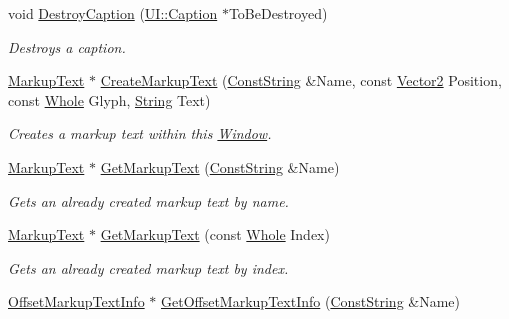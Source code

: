 \begin{DoxyCompactItemize}
void \hyperlink{classphys_1_1UI_1_1Window_a4e3dbe56ca1efce7ac1d26ceb8f7e915}{DestroyCaption} (\hyperlink{classphys_1_1UI_1_1Caption}{UI::Caption} $\ast$ToBeDestroyed)
\begin{DoxyCompactList}\small\item\em Destroys a caption. \item\end{DoxyCompactList}\item 
\hyperlink{classphys_1_1UI_1_1MarkupText}{MarkupText} $\ast$ \hyperlink{classphys_1_1UI_1_1Window_a39e80f1bf3dcf3441c107b359b888305}{CreateMarkupText} (\hyperlink{namespacephys_a5ce5049f8b4bf88d6413c47b504ebb31}{ConstString} \&Name, const \hyperlink{classphys_1_1Vector2}{Vector2} Position, const \hyperlink{namespacephys_a460f6bc24c8dd347b05e0366ae34f34a}{Whole} Glyph, \hyperlink{namespacephys_aa03900411993de7fbfec4789bc1d392e}{String} Text)
\begin{DoxyCompactList}\small\item\em Creates a markup text within this \hyperlink{classphys_1_1UI_1_1Window}{Window}. \item\end{DoxyCompactList}\item 
\hyperlink{classphys_1_1UI_1_1MarkupText}{MarkupText} $\ast$ \hyperlink{classphys_1_1UI_1_1Window_af5bf2246915fc68558d2a68ed016a68b}{GetMarkupText} (\hyperlink{namespacephys_a5ce5049f8b4bf88d6413c47b504ebb31}{ConstString} \&Name)
\begin{DoxyCompactList}\small\item\em Gets an already created markup text by name. \item\end{DoxyCompactList}\item 
\hyperlink{classphys_1_1UI_1_1MarkupText}{MarkupText} $\ast$ \hyperlink{classphys_1_1UI_1_1Window_a90e9c02fe3374e386495e95965e25158}{GetMarkupText} (const \hyperlink{namespacephys_a460f6bc24c8dd347b05e0366ae34f34a}{Whole} Index)
\begin{DoxyCompactList}\small\item\em Gets an already created markup text by index. \item\end{DoxyCompactList}\item 
\hyperlink{structphys_1_1UI_1_1ResizingInfo}{OffsetMarkupTextInfo} $\ast$ \hyperlink{classphys_1_1UI_1_1Window_a9906bb131f631af0a9aed7dbb7744112}{GetOffsetMarkupTextInfo} (\hyperlink{namespacephys_a5ce5049f8b4bf88d6413c47b504ebb31}{ConstString} \&Name)

\end{DoxyCompactItemize}
